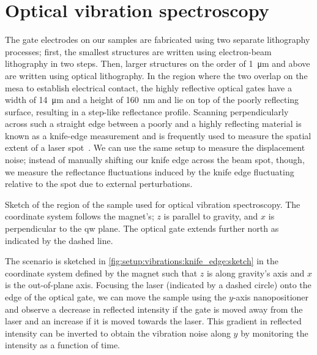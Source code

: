 \section{Optical vibration spectroscopy}\label{sec:setup:vibrations:optic}
The gate electrodes on our samples are fabricated using two separate lithography processes; first, the smallest structures are written using electron-beam lithography in two steps.
Then, larger structures on the order of \qty{1}{\micro\meter} and above are written using optical lithography.
In the region where the two overlap on the mesa to establish electrical contact, the highly reflective  optical gates have a width of \qty{14}{\micro\meter} and a height of \qty{160}{\nano\meter} and lie on top of the poorly reflecting  surface, resulting in a step-like reflectance profile.
Scanning perpendicularly across such a straight edge between a poorly and a highly reflecting material is known as a knife-edge measurement and is frequently used to measure the spatial extent of a laser spot~\cite{Arnaud1971,Skinner1972,Khosrofian1983}.
We can use the same setup to measure the displacement noise; instead of manually shifting our knife edge across the beam spot, though, we measure the reflectance fluctuations induced by the knife edge fluctuating relative to the spot due to external perturbations.

\begin{marginfigure}[*-10]
    \centering
    
    \caption[]{
        Sketch of the region of the sample used for optical vibration spectroscopy.
        The coordinate system follows the magnet's; $z$ is parallel to gravity, and $x$ is perpendicular to the \gls{qw} plane.
        The optical gate extends further north as indicated by the dashed line.
    }
    \label{fig:setup:vibrations:knife_edge:sketch}
\end{marginfigure}

The scenario is sketched in \cref{fig:setup:vibrations:knife_edge:sketch} in the coordinate system defined by the magnet such that $z$ is along gravity's axis and $x$ is the out-of-plane axis.
Focusing the laser (indicated by a dashed circle) onto the edge of the optical gate, we can move the sample using the $y$-axis nanopositioner and observe a decrease in reflected intensity if the gate is moved away from the laser and an increase if it is moved towards the laser.
This gradient in reflected intensity can be inverted to obtain the vibration noise along $y$ by monitoring the intensity as a function of time.

